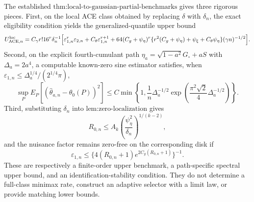 The established \(\text{thm:local-to-gaussian-partial-benchmarks}\) gives three rigorous pieces.  First, on the local ACE class obtained by replacing \(\delta\) with \(\delta_n\), the exact eligibility condition yields the generalized-quantile upper bound
\[
 U_{\mathrm{ACE},n}^{\mathrm{loc}}
 =C_{\gamma}r!16^r\delta_n^{-1}
 \Bigl[
  \varepsilon_{1,n}^r\varepsilon_{2,n}
  +C_{\theta}\varepsilon_{1,n}^{r+1}
  +64(C_g+\psi_{\eta})^r
   \{r^2(C_g+\psi_{\eta})+\psi_{\xi}+C_{\theta}\psi_{\eta}\}
   (\gamma n)^{-1/2}
 \Bigr].
\]
Second, on the explicit fourth-cumulant path
\(
 \eta_a=\sqrt{1-a^2}G_{\circ}+aS
\)
with \(\Delta_a=2a^4\), a computable known-zero sine estimator satisfies, when
\(
 \varepsilon_{1,n}\le \Delta_a^{1/4}/(2^{1/4}\pi)
\),
\[
 \sup_P E_P[(\widehat\theta_{a,n}-\theta_0(P))^2]
 \le C\min\!\left\{
  1,\frac{1}{n}\Delta_a^{-1/2}
  \exp\!\left(\frac{\pi^2\sqrt2}{4}\Delta_a^{-1/2}\right)
 \right\}.
\]
Third, substituting \(\delta_n\) into \(\text{lem:zero-localization}\) gives
\[
 R_{0,n}\le A_k
 \left(\frac{\psi_{\eta}^2}{\delta_n}\right)^{1/(k-2)},
\]
and the nuisance factor remains zero-free on the corresponding disk if
\[
 \varepsilon_{1,n}
 \le\{4(R_{0,n}+1)e^{2C_g(R_{0,n}+1)}\}^{-1}.
\]
These are respectively a finite-order upper benchmark, a path-specific spectral upper bound, and an identification-stability condition.  They do not determine a full-class minimax rate, construct an adaptive selector with a limit law, or provide matching lower bounds.